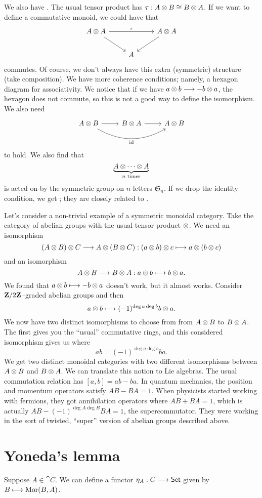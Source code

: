 \documentclass[11pt, twoside]{article}
\begin{document}
We also have \href{https://en.wikipedia.org/wiki/Symmetric_monoidal_category}{}. The usual tensor product has $\tau:A\otimes B \cong B \otimes A$. If we want to define a commutative monoid, we could have that
 \[
\begin{tikzcd}
A\tensor A \arrow[rr, "\tau"]  \arrow [rd]&& A\tensor A \arrow[ld]\\
& A
\end{tikzcd}
\]
commutes. Of course, we don't always have this extra (symmetric) structure (take composition). We have more coherence conditions; namely, a hexagon diagram for associativity. We notice that if we have $a\otimes b\longrightarrow -b\otimes a$, the hexagon does not commute, so this is not a good way to define the isomorphism. We also need
 \[
\begin{tikzcd}
A \tensor B \arrow[r] \arrow[rr, bend right, "\mathrm{id}",swap] & B \tensor A\arrow [r] &A\tensor B
\end{tikzcd}
\]
to hold. We also find that
$$
\underbrace{A \otimes \cdots \otimes A }_{n \textrm{ times}}
$$
is acted on by the symmetric group on $n$ letters $\mathfrak{S}_n$. If we drop the identity condition, we get \href{https://en.wikipedia.org/wiki/Braided_monoidal_category}{}; they are closely related to \href{https://en.wikipedia.org/wiki/Braid_group}{}.

Let's consider a non-trivial example of a symmetric monoidal category. Take the category of abelian groups with the usual tensor product $\otimes$. We need an isomorphism 
$$
(A\otimes B)\otimes C \longrightarrow A \otimes (B\otimes C) : (a\otimes b)\otimes c \longmapsto a \otimes (b\otimes c) 
$$
and an isomorphism
$$
A \otimes B \longrightarrow B\otimes A : a\otimes b\longmapsto b\otimes a.
$$ 
We found that $a\otimes b\longmapsto -b\otimes a$ doesn't work, but it almost works. Consider $\mathbf{Z}/2\mathbf{Z}$--graded abelian groups and then
$$
a\otimes b \longmapsto (-1)^{\deg a  \deg b}b\otimes a.
$$
We now have two distinct isomorphisms to choose from from $A\otimes B$ to $B\otimes A$. The first gives you the ``usual'' commutative rings, and this considered isomorphism gives us \href{https://en.wikipedia.org/wiki/Supercommutative_algebra}{} where 
$$
ab = (-1)^ {\deg a  \deg b}b a.
$$
We get two distinct monoidal categories with two different isomorphisms between $A\otimes B$ and $B\otimes A$. We can translate this notion to Lie algebras. The usual commutation relation has $[a,b] = ab-ba$. In quantum mechanics, the position and momentum operators satisfy $AB-BA=1$. When physicists started working with fermions, they got annihilation operators where $AB+BA =1$, which is actually $AB - (-1)^{\deg A \deg B} BA = 1$, the supercommutator. They were working in the sort of twisted, ``super'' version of abelian groups described above.

\section{Yoneda's lemma}
Suppose $A \in \cat C$. We can define a functor $\eta_A:\relax C \longrightarrow \textsf{Set}$ given by $B \longmapsto \operatorname{Mor}(B,A)$.
\newpage


\printindex
\end{document}
